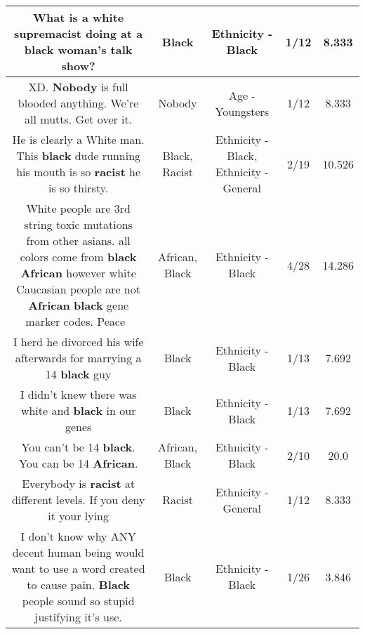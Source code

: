 \documentclass[11pt]{article}
\newlength\mylength
\begin{document}
\begin{center}
\begin{longtable}{|C{.65\mylength}|C{.30\mylength}|C{.12\mylength}|C{.12\mylength}|C{.12\mylength}|}
  \small What is a white supremacist doing at a \textbf{black} woman's talk show?\normalsize   & Black & Ethnicity - Black & 1/12 & 8.333 \\  \hline
  \small XD. \textbf{Nobody} is full blooded anything. We're all mutts. Get over it.\normalsize   & Nobody & Age - Youngsters & 1/12 & 8.333 \\  \hline
  \small He is clearly a White man. This \textbf{black} dude running his mouth is so \textbf{racist} he is so thirsty.\normalsize   & Black, Racist & Ethnicity - Black, Ethnicity - General & 2/19 & 10.526 \\  \hline
  \small White people are 3rd string toxic mutations from other asians. all colors come from \textbf{black} \textbf{African} however white Caucasian people are not \textbf{African} \textbf{black} gene marker codes. Peace💯🆙\normalsize   & African, Black & Ethnicity - Black & 4/28 & 14.286 \\  \hline
  \small I herd he divorced his wife afterwards for marrying a 14 \textbf{black} guy\normalsize   & Black & Ethnicity - Black & 1/13 & 7.692 \\  \hline
  \small I didn't knew there was  white and  \textbf{black} in our genes\normalsize   & Black & Ethnicity - Black & 1/13 & 7.692 \\  \hline
  \small You can't be 14 \textbf{black}. You can be 14 \textbf{African}.\normalsize   & African, Black & Ethnicity - Black & 2/10 & 20.0 \\  \hline
  \small Everybody is \textbf{racist} at different levels. If you deny it your lying\normalsize   & Racist & Ethnicity - General & 1/12 & 8.333 \\  \hline
  \small I don't know why ANY decent human being would want to use a word created to cause pain. \textbf{Black} people sound so stupid justifying it's use.\normalsize   & Black & Ethnicity - Black & 1/26 & 3.846 \\  \hline

\end{longtable}
\end{center}
\end{document}
